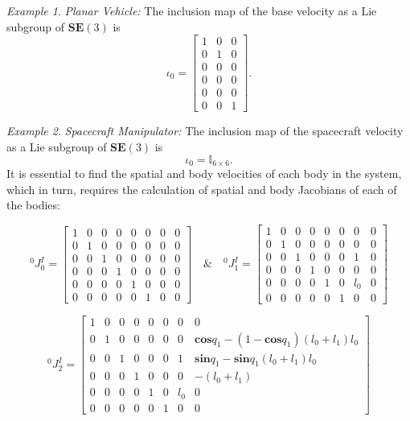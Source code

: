 \documentclass[lettersize,journal]{IEEEtran}
\def \SE {\textbf{SE}(3)}
\def \sin {\textbf{sin}}
\def \cos {\textbf{cos}}
\theoremstyle{remark}
\newtheorem{example}{Example}[subsection]
\begin{document}
\begin{example}{ \textit{Planar Vehicle:}}
The inclusion map of the base velocity as a Lie subgroup of $\SE$ is
\begin{equation*}
    \iota_0=\begin{bmatrix}
    1 & 0 & 0\\
    0 & 1 & 0\\
    0 & 0 & 0\\
    0 & 0 & 0\\
    0 & 0 & 0\\
    0 & 0 & 1
    \end{bmatrix}.
\end{equation*}
\end{example}
\begin{example}{ \textit{Spacecraft Manipulator:}}
The inclusion map of the spacecraft velocity as a Lie subgroup of $\SE$ is
\begin{equation*}
    \iota_0=\mathbb{I}_{6 \times 6}.
\end{equation*}
It is essential to find the spatial and body velocities of each body in the system, which in turn, requires the calculation of spatial and body Jacobians of each of the bodies:

\begin{strip}
\begin{equation*}
    ^0J^I_0=\begin{bmatrix}
    1 & 0 & 0 & 0 & 0 & 0& 0 & 0\\
    0 & 1 & 0 & 0 & 0 & 0& 0 & 0\\
    0 & 0 & 1 & 0 & 0 & 0& 0 & 0\\
    0 & 0 & 0 & 1 & 0 & 0& 0 & 0\\
    0 & 0 & 0 & 0 & 1 & 0& 0 & 0\\
    0 & 0 & 0 & 0 & 0 & 1& 0 & 0
    \end{bmatrix} \quad \& \quad ^0J^I_1=\begin{bmatrix}
    1 & 0 & 0 & 0 & 0 & 0& 0 & 0\\
    0 & 1 & 0 & 0 & 0 & 0& 0 & 0\\
    0 & 0 & 1 & 0 & 0 & 0& 1 & 0\\
    0 & 0 & 0 & 1 & 0 & 0& 0 & 0\\
    0 & 0 & 0 & 0 & 1 & 0& l_0 & 0\\
    0 & 0 & 0 & 0 & 0 & 1& 0 & 0
    \end{bmatrix}
\end{equation*}

\begin{equation*}
    ^0J^I_2=\begin{bmatrix}
    1 & 0 & 0 & 0 & 0 & 0& 0 & 0\\
    0 & 1 & 0 & 0 & 0 & 0& 0 & \cos q_1 -(1-\cos q_1)(l_0+l_1)l_0\\
    0 & 0 & 1 & 0 & 0 & 0& 1 & \sin q_1 -\sin q_1(l_0+l_1)l_0\\
    0 & 0 & 0 & 1 & 0 & 0& 0 & -(l_0+l_1)\\
    0 & 0 & 0 & 0 & 1 & 0& l_0 & 0\\
    0 & 0 & 0 & 0 & 0 & 1& 0 & 0
    \end{bmatrix}
\end{equation*}


\end{strip}
\end{example}
\end{document}
